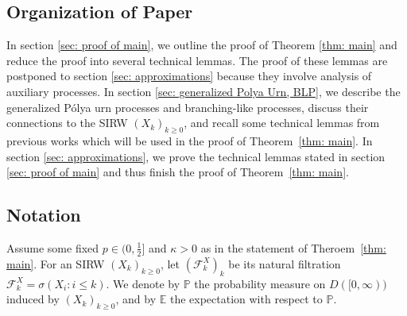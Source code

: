 \documentclass[twoside,12pt, a4paper, final]{article}
\numberwithin{equation}{section}
\theoremstyle{remark}
\begin{document}
	\subsection{Organization of Paper}
	In section \ref{sec: proof of main}, we outline the proof of Theorem \ref{thm: main} and reduce the proof into several technical lemmas. The proof of these lemmas are postponed to section \ref{sec: approximations} because they involve analysis of auxiliary processes. In section \ref{sec: generalized Polya Urn, BLP}, we describe the generalized P\'{o}lya urn processes and branching-like processes, discuss their connections to the SIRW $(X_k)_{k\geq 0}$, and recall some technical lemmas from previous works which will be used in the proof of Theorem~\ref{thm: main}. In section \ref{sec: approximations}, we prove the technical lemmas stated in section \ref{sec: proof of main} and thus finish the proof of Theorem~\ref{thm: main}. 
	
	\subsection{Notation}
	
	Assume some fixed $p \in (0,\frac{1}{2}]$ and $\kappa > 0$ as in the statement of Theroem~\ref{thm: main}. For an SIRW $(X_k)_{k\geq 0}$, let $(\mathcal{F}^X_k)_k$ be its natural filtration $\mathcal{F}^X_k = \sigma\left(X_i: i\leq k \right).$ 
	We denote by $\mathbb{P}$ the probability measure on $D([0,\infty))$ induced by $(X_k)_{k\geq 0}$, and by $\mathbb{E}$ the expectation with respect to $\mathbb{P}$.
	
\end{document}
